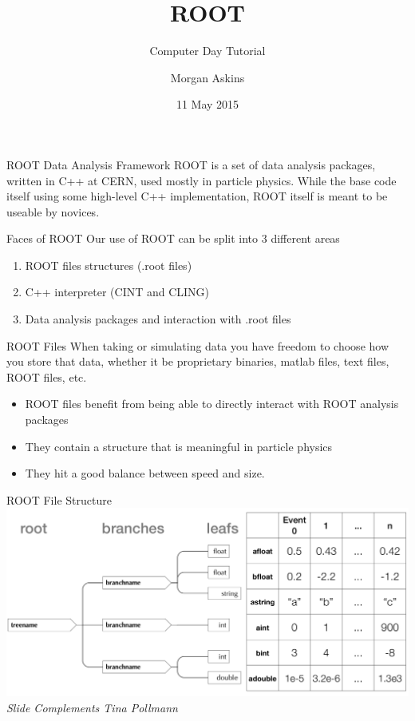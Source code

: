 \documentclass[xcolor=svgnames]{beamer}
\title{ROOT}
\subtitle{Computer Day Tutorial}
\author{Morgan Askins}
\date{11 May 2015}
\begin{document}
{
\begin{frame}[noframenumbering]
  \titlepage
\end{frame}
}


\begin{frame}{ROOT Data Analysis Framework}
  ROOT is a set of data analysis packages, written in C++ at CERN, used mostly in particle
  physics. While the base code itself using some high-level C++ implementation, ROOT itself
  is meant to be useable by novices.
\end{frame}

\begin{frame}{Faces of ROOT}
  Our use of ROOT can be split into 3 different areas
  \begin{enumerate}
  \item ROOT files structures (.root files)
  \item C++ interpreter (CINT and CLING)
  \item Data analysis packages and interaction with .root files
  \end{enumerate}
\end{frame}

\begin{frame}{ROOT Files}
  When taking or simulating data you have freedom to choose how you store that data, whether
  it be proprietary binaries, matlab files, text files, ROOT files, etc.
  \begin{itemize}
  \item ROOT files benefit from being able to directly interact with ROOT analysis packages
  \item They contain a structure that is meaningful in particle physics
  \item They hit a good balance between speed and size.
  \end{itemize}
\end{frame}

\begin{frame}{ROOT File Structure}
  \includegraphics[width=\textwidth]{images/root_structure.png}\\
  \textit{\small Slide Complements Tina Pollmann}
\end{frame}
\end{document}
